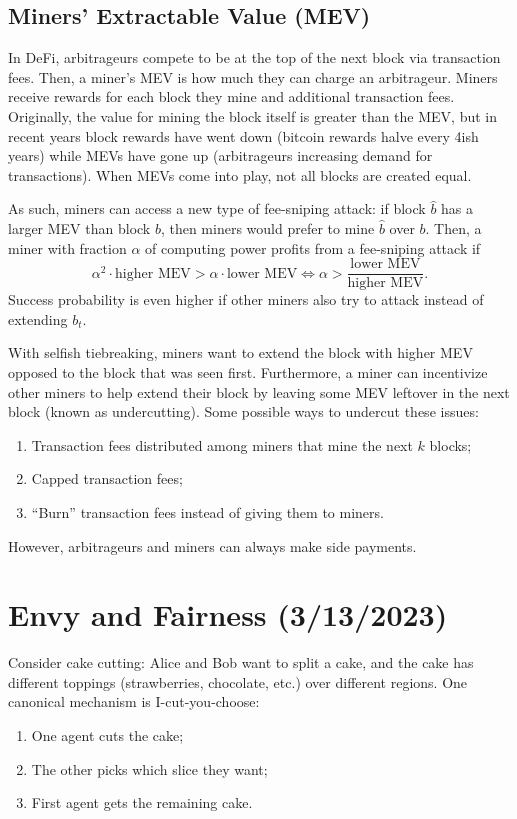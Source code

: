 \documentclass[dvipsnames]{article}
\theoremstyle{definition}
\theoremstyle{remark}
\begin{document}
\subsection{Miners’ Extractable Value (MEV)}
In DeFi, arbitrageurs compete to be at the top of the next block via transaction fees. Then, a miner's MEV is how much they can charge an arbitrageur. Miners receive rewards for each block they mine and additional transaction fees. Originally, the value for mining the block itself is greater than the MEV, but in recent years block rewards have went down (bitcoin rewards halve every 4ish years) while MEVs have gone up (arbitrageurs increasing demand for transactions). When MEVs come into play, not all blocks are created equal.

As such, miners can access a new type of fee-sniping attack: if block $\hat{b}$ has a larger MEV than block $b$, then miners would prefer to mine $\hat{b}$ over $b$. Then, a miner with fraction $\alpha$ of computing power profits from a fee-sniping attack if 
$$\alpha^2 \cdot \text{higher MEV} > \alpha \cdot \text{lower MEV} \iff \alpha > \frac{\text{lower MEV}}{\text{higher MEV}}.$$
Success probability is even higher if other miners also try to attack instead of extending $b_t$.

With selfish tiebreaking, miners want to extend the block with higher MEV opposed to the block that was seen first. Furthermore, a miner can incentivize other miners to help extend their block by leaving some MEV leftover in the next block (known as undercutting). Some possible ways to undercut these issues: 
\begin{enumerate}
	\item Transaction fees distributed among miners that mine the next $k$ blocks;
	\item Capped transaction fees;
	\item ``Burn'' transaction fees instead of giving them to miners.
\end{enumerate}
However, arbitrageurs and miners can always make side payments.

\newpage

\section{Envy and Fairness (3/13/2023)}

Consider cake cutting: Alice and Bob want to split a cake, and the cake has different toppings (strawberries, chocolate, etc.) over different regions. One canonical mechanism is I-cut-you-choose: 
\begin{enumerate}
	\item One agent cuts the cake;
	\item The other picks which slice they want;
	\item First agent gets the remaining cake.
\end{enumerate}
\end{document}
